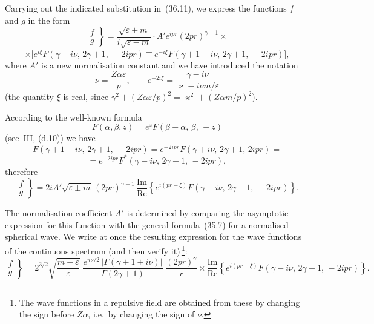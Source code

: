 Carrying out the indicated substitution in~(36.11), we express the functions $f$ and $g$ in the form
\[
\left.\begin{aligned} f \\ g \end{aligned}\right\}
= \frac{\sqrt{\varepsilon+m}}{i\sqrt{\varepsilon-m}}
\cdot A' e^{ipr}(2pr)^{\gamma-1}\times
\]
\[
\times \bigl[e^{i\xi}F(\gamma - i\nu,\,2\gamma+1,\,-2ipr) \mp e^{-i\xi}F(\gamma + 1 - i\nu,\,2\gamma+1,\,-2ipr)\bigr],
\]
where $A'$ is a new normalisation constant and we have introduced the notation
\begin{equation}
\nu = \frac{Z\alpha\varepsilon}{p},\qquad e^{-2i\xi} = \frac{\gamma - i\nu}{\varkappa - i\nu m/\varepsilon}
\tag{36.13}
\end{equation}
(the quantity $\xi$ is real, since $\gamma^2 + (Z\alpha\varepsilon/p)^2 = \varkappa^2 + (Z\alpha m/p)^2$).

According to the well-known formula
\[
F(\alpha,\beta,z) = e^z F(\beta - \alpha,\,\beta,\,-z)
\]
(see~III, (d.10)) we have
\[
F(\gamma + 1 - i\nu,\,2\gamma+1,\,-2ipr) = e^{-2ipr}F(\gamma + i\nu,\,2\gamma+1,\,2ipr) =
\]
\[
= e^{-2ipr}F^*(\gamma - i\nu,\,2\gamma+1,\,-2ipr),
\]
therefore
\begin{equation}
\left.\begin{aligned} f \\ g \end{aligned}\right\}
= 2iA'\sqrt{\varepsilon\pm m}\,(2pr)^{\gamma-1}\,\frac{\mathrm{Im}}{\mathrm{Re}}\left\{e^{i(pr+\xi)}F(\gamma - i\nu,\,2\gamma+1,\,-2ipr)\right\}.
\tag{36.14}
\end{equation}

The normalisation coefficient $A'$ is determined by comparing the asymptotic expression for this function with the general formula~(35.7) for a normalised spherical wave. We write at once the resulting expression for the wave functions of the continuous spectrum (and then verify it)\,\footnote{The wave functions in a repulsive field are obtained from these by changing the sign before $Z\alpha$, i.e.\ by changing the sign of $\nu$.}:
\begin{equation}
\left.\begin{aligned} f \\ g \end{aligned}\right\}
= 2^{3/2}\sqrt{\frac{m\pm\varepsilon}{\varepsilon}}\;\frac{e^{\pi\nu/2}\,|\Gamma(\gamma + 1 + i\nu)|}{\Gamma(2\gamma+1)}\;\frac{(2pr)^\gamma}{r}
\times \frac{\mathrm{Im}}{\mathrm{Re}}\left\{e^{i(pr+\xi)}F(\gamma - i\nu,\,2\gamma+1,\,-2ipr)\right\}.
\tag{36.15}
\end{equation}

